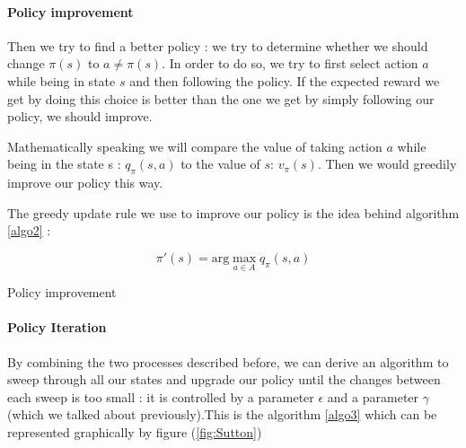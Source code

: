 \documentclass[14pt,a4paper]{article}
\theoremstyle{definition}
\begin{document}
\paragraph{Policy improvement}

Then we try to find a better policy : we try to determine whether we should change $\pi(s) $ to $ a\neq\pi(s)$. In order to do so, we try to first select action $a$ while being in state $s$ and then following the policy. If the expected reward we get by doing this choice is better than the one we get by simply following our policy, we should improve.

Mathematically speaking we will compare the value of taking action $a$ while being in the state s : $q_{\pi}(s,a)$ to the value of $s$: $v_{\pi}(s)$. Then we would greedily improve our policy this way.

The greedy update rule we use to improve our policy is the idea behind algorithm \ref{algo2} : 

$$ 
\pi'(s)=\text{arg}\max_{a \in A}q_{\pi}(s,a)
$$

\begin{algorithm}
\label{algo2}

    
    \caption{Policy improvement}
\end{algorithm}



\paragraph{Policy Iteration} By combining the two processes described before, we can derive an algorithm to sweep through all our states and upgrade our policy until the changes between each sweep is too small : it is controlled by a parameter $\epsilon$ and a parameter $\gamma$ (which we talked about previously).This is the algorithm \ref{algo3} which can be represented graphically by figure (\ref{fig:Sutton})
\end{document}
